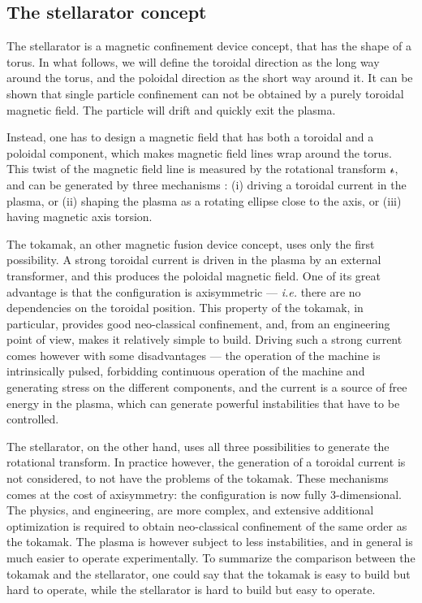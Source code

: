 \documentclass[my_thesis.tex]{subfiles}
\begin{document}
\subsection{The stellarator concept}
The stellarator is a magnetic confinement device concept, that has the shape of a torus. In what follows, we will define the toroidal direction as the long way around the torus, and the poloidal direction as the short way around it. It can be shown that single particle confinement can not be obtained by a purely toroidal magnetic field. The particle will drift and quickly exit the plasma. 

Instead, one has to design a magnetic field that has both a toroidal and a poloidal component, which makes magnetic field lines wrap around the torus. This twist of the magnetic field line is measured by the rotational transform $\text{$\iota\!\!$-}$, and can be generated by three mechanisms \citep{Helander2014}: (i) driving a toroidal current in the plasma, or (ii) shaping the plasma as a rotating ellipse close to the axis, or (iii) having magnetic axis torsion.

The tokamak, an other magnetic fusion device concept, uses only the first possibility. A strong toroidal current is driven in the plasma by an external transformer, and this produces the poloidal magnetic field. One of its great advantage is that the configuration is axisymmetric --- \textit{i.e.} there are no dependencies on the toroidal position. This property of the tokamak, in particular, provides good neo-classical confinement, and, from an engineering point of view, makes it relatively simple to build. Driving such a strong current comes however with some disadvantages --- the operation of the machine is intrinsically pulsed, forbidding continuous operation of the machine and generating stress on the different components, and the current is a source of free energy in the plasma, which can generate powerful instabilities that have to be controlled.

The stellarator, on the other hand, uses all three possibilities to generate the rotational transform. In practice however, the generation of a toroidal current is not considered, to not have the problems of the tokamak. These mechanisms comes at the cost of axisymmetry: the configuration is now fully 3-dimensional. The physics, and engineering, are more complex, and extensive additional optimization is required to obtain neo-classical confinement of the same order as the tokamak. The plasma is however subject to less instabilities, and in general is much easier to operate experimentally. To summarize the comparison between the tokamak and the stellarator, one could say that the tokamak is easy to build but hard to operate, while the stellarator is hard to build but easy to operate.
\end{document}
